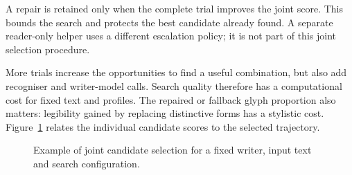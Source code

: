 \begin{designalgorithm}
\caption{Joint candidate search and bounded legibility repair}
\label{alg:des-joint}
\begin{designpseudo}
\end{designpseudo}
\end{designalgorithm}

A repair is retained only when the complete trial improves the joint score. This bounds the search and protects the best candidate already found. A separate reader-only helper uses a different escalation policy; it is not part of this joint selection procedure.


More trials increase the opportunities to find a useful combination, but also add recogniser and writer-model calls. Search quality therefore has a computational cost for fixed text and profiles. The repaired or fallback glyph proportion also matters: legibility gained by replacing distinctive forms has a stylistic cost. Figure~\ref{fig:des-candidates} relates the individual candidate scores to the selected trajectory.


\begin{figure}[!htbp]\centering
{}
\caption{Example of joint candidate selection for a fixed writer, input text and search configuration.}
\label{fig:des-candidates}
\end{figure}

